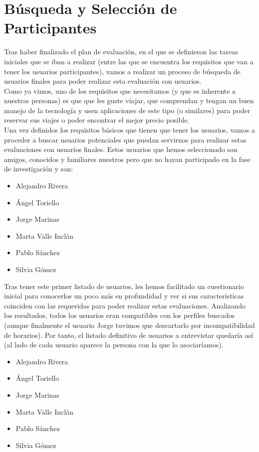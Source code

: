 \section{Búsqueda y Selección de Participantes}
Tras haber finalizado el plan de evaluación, en el que se definieron las tareas iniciales que se iban a realizar (entre las que se
encuentra los requisitos que van a tener los usuarios participantes), vamos a realizar un proceso de búsqueda de usuarios finales 
para poder realizar esta evaluación con usuarios. \\

Como ya vimos, uno de los requisitos que necesitamos (y que es inherente a nuestras personas) es que que les guste viajar, que comprendan
y tengan un buen manejo de la tecnología y usen aplicaciones de este tipo (o similares) para poder reservar sus viajes 
o poder encontrar el mejor precio posible. \\

Una vez definidos los requisitos básicos que tienen que tener los usuarios, vamos a proceder a buscar usuarios potenciales que puedan servirnos
para realizar estas evaluaciones con usuarios finales. Estos usuarios que hemos seleccionado son amigos, conocidos y familiares nuestros pero que no hayan
participado en la fase de investigación y son:
\begin{itemize}
    \item Alejandro Rivera
    \item Ángel Toriello
    \item Jorge Marinas
    \item Marta Valle Inclán
    \item Pablo Sánchez
    \item Silvia Gómez
\end{itemize}

Tras tener este primer listado de usuarios, les hemos facilitado un cuestionario inicial para conocerlos un poco más en profundidad y ver si sus características
coinciden con las requeridas para poder realizar estas evaluaciones. Analizando los resultados, todos los usuarios eran compatibles con los perfiles buscados (aunque
finalmente el usuario Jorge tuvimos que descartarlo por incompatibilidad de horarios). Por tanto, el listado definitivo de usuarios a entrevistar quedaría así (al lado
de cada usuario aparece la persona con la que lo asociaríamos).
\begin{itemize}
    \item Alejandro Rivera
    \item Ángel Toriello
    \item Jorge Marinas
    \item Marta Valle Inclán
    \item Pablo Sánchez
    \item Silvia Gómez
\end{itemize}

